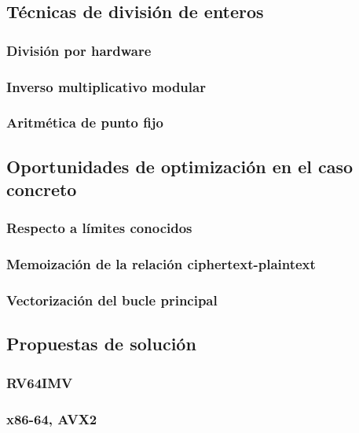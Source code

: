 \documentclass[conference, 14pt]{IEEEtran}
\begin{document}
\subsection{Técnicas de división de enteros}

\subsubsection{División por hardware}

\subsubsection{Inverso multiplicativo modular}

\subsubsection{Aritmética de punto fijo}

\subsection{Oportunidades de optimización en el caso concreto}

\subsubsection{Respecto a límites conocidos}

\subsubsection{Memoización de la relación ciphertext-plaintext}

\subsubsection{Vectorización del bucle principal}

\subsection{Propuestas de solución}

\subsubsection{RV64IMV}

\subsubsection{x86-64, AVX2}
\end{document}
